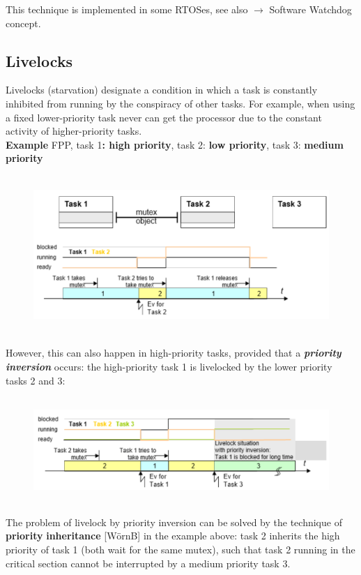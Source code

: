 This technique is implemented in some RTOSes, see also $\rightarrow$ Software Watchdog concept.\\
\newpage
\subsection{Livelocks}

Livelocks (starvation) designate a condition in which a task is constantly inhibited from running by the conspiracy of other tasks. For example, when using a fixed lower-priority task never can get the processor due to the constant activity of higher-priority tasks.\\

\textbf{Example} FPP, task 1\textbf{: high priority}, task 2:\textbf{ low priority}, task 3:\textbf{ medium priority}

 	\begin{figure}[h]
    \centering
    \includegraphics[width=12cm, height=6cm]{Images/image109.png}
    \label{fig:Fig }
    \end{figure}

However, this can also happen in high-priority tasks, provided that a \textbf{\textit{priority inversion}} occurs: the high-priority task 1 is livelocked by the lower priority tasks 2 and 3:

 	\begin{figure}[h]
    \centering
    \includegraphics[width=12cm, height=4cm]{Images/image110.png}
    \label{fig:Fig }
    \end{figure}
\newpage
The problem of livelock by priority inversion can be solved by the technique of \textbf{priority} \textbf{inheritance} [W\"{o}rnB]   in the example above: task 2 inherits the high priority of task 1 (both wait for the same mutex), such that task 2 running in the critical section cannot be interrupted by a medium priority task 3. \\

